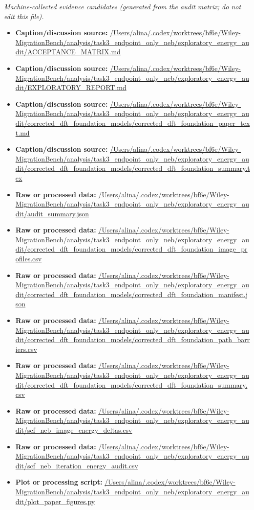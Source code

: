 \emph{Machine-collected evidence candidates (generated from the audit matrix; do not edit this file).}
\begin{itemize}[leftmargin=1.4em,noitemsep]
\item \textbf{Caption/discussion source:} \url{/Users/alina/.codex/worktrees/bf6e/Wiley-MigrationBench/analysis/task3_endpoint_only_neb/exploratory_energy_audit/ACCEPTANCE_MATRIX.md}
\item \textbf{Caption/discussion source:} \url{/Users/alina/.codex/worktrees/bf6e/Wiley-MigrationBench/analysis/task3_endpoint_only_neb/exploratory_energy_audit/EXPLORATORY_REPORT.md}
\item \textbf{Caption/discussion source:} \url{/Users/alina/.codex/worktrees/bf6e/Wiley-MigrationBench/analysis/task3_endpoint_only_neb/exploratory_energy_audit/corrected_dft_foundation_models/corrected_dft_foundation_paper_text.md}
\item \textbf{Caption/discussion source:} \url{/Users/alina/.codex/worktrees/bf6e/Wiley-MigrationBench/analysis/task3_endpoint_only_neb/exploratory_energy_audit/corrected_dft_foundation_models/corrected_dft_foundation_summary.tex}
\item \textbf{Raw or processed data:} \url{/Users/alina/.codex/worktrees/bf6e/Wiley-MigrationBench/analysis/task3_endpoint_only_neb/exploratory_energy_audit/audit_summary.json}
\item \textbf{Raw or processed data:} \url{/Users/alina/.codex/worktrees/bf6e/Wiley-MigrationBench/analysis/task3_endpoint_only_neb/exploratory_energy_audit/corrected_dft_foundation_models/corrected_dft_foundation_image_profiles.csv}
\item \textbf{Raw or processed data:} \url{/Users/alina/.codex/worktrees/bf6e/Wiley-MigrationBench/analysis/task3_endpoint_only_neb/exploratory_energy_audit/corrected_dft_foundation_models/corrected_dft_foundation_manifest.json}
\item \textbf{Raw or processed data:} \url{/Users/alina/.codex/worktrees/bf6e/Wiley-MigrationBench/analysis/task3_endpoint_only_neb/exploratory_energy_audit/corrected_dft_foundation_models/corrected_dft_foundation_path_barriers.csv}
\item \textbf{Raw or processed data:} \url{/Users/alina/.codex/worktrees/bf6e/Wiley-MigrationBench/analysis/task3_endpoint_only_neb/exploratory_energy_audit/corrected_dft_foundation_models/corrected_dft_foundation_summary.csv}
\item \textbf{Raw or processed data:} \url{/Users/alina/.codex/worktrees/bf6e/Wiley-MigrationBench/analysis/task3_endpoint_only_neb/exploratory_energy_audit/scf_neb_image_energy_deltas.csv}
\item \textbf{Raw or processed data:} \url{/Users/alina/.codex/worktrees/bf6e/Wiley-MigrationBench/analysis/task3_endpoint_only_neb/exploratory_energy_audit/scf_neb_iteration_energy_audit.csv}
\item \textbf{Plot or processing script:} \url{/Users/alina/.codex/worktrees/bf6e/Wiley-MigrationBench/analysis/task3_endpoint_only_neb/exploratory_energy_audit/plot_paper_figures.py}
\end{itemize}
